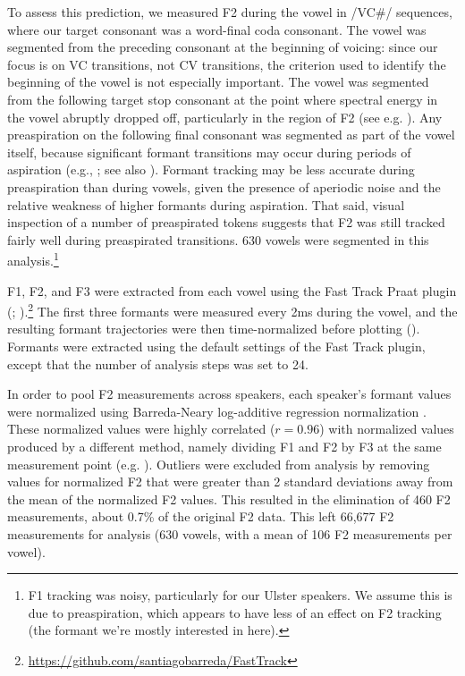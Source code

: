\documentclass[output=paper,colorlinks,citecolor=brown]{langscibook}
\begin{document}
To assess this prediction, we measured F2 during the vowel in /VC\#/ sequences, where our target consonant was a word-final coda consonant. The vowel was segmented from the preceding consonant at the beginning of voicing: since our focus is on VC transitions, not CV transitions, the criterion used to identify the beginning of the vowel is not especially important. The vowel was segmented from the following target stop consonant at the point where spectral energy in the vowel abruptly dropped off, particularly in the region of F2 
(see e.g. \citealt{Turk_etal2006_acoustic_prosody_research}). Any preaspiration on the following final consonant was segmented as part of the vowel itself, because significant formant transitions may occur during periods of aspiration (e.g., \citealt{Stevens_Klatt1974_formants_stop_voicing}; see also \citealt{Clayton2010_preaspiration_DISS}). Formant tracking may be less accurate during preaspiration than during vowels, given the presence of aperiodic noise and the relative weakness of higher formants during aspiration. That said, visual inspection of a number of preaspirated tokens suggests that F2 was still tracked fairly well during preaspirated transitions. 630 vowels were segmented in this analysis.\footnote{F1 tracking was noisy, particularly for our Ulster speakers. We assume this is due to preaspiration, which appears to have less of an effect on F2 tracking (the formant we're mostly interested in here).}


F1, F2, and F3 were extracted from each vowel using the Fast Track Praat plugin (\cite{Praat}; \cite{Barreda2021_FastTrack_formant_tracking}).\footnote{\url{https://github.com/santiagobarreda/FastTrack}} The first three formants were measured every 2ms during the vowel, and the resulting formant trajectories were then time-normalized before plotting (). Formants were extracted using the default settings of the Fast Track plugin, except that the number of analysis steps was set to 24.

In order to pool F2 measurements across speakers, each speaker's formant values were normalized using Barreda-Neary log-additive regression normalization \citep{Barreda_Neary2018_regression_vnorm}. These normalized values were highly correlated ($r = 0.96$) with normalized values produced by a different method, namely dividing F1 and F2 by F3 at the same measurement point (e.g. \citealt{Monahan_Idsardi2010_formant_ratios}). Outliers were excluded from analysis by removing values for normalized F2 that were greater than 2 standard deviations away from the mean of the normalized F2 values. This resulted in the elimination of 460 F2 measurements, about 0.7\% of the original F2 data. This left 66,677 F2 measurements for analysis (630 vowels, with a mean of 106 F2 measurements per vowel).
\end{document}
